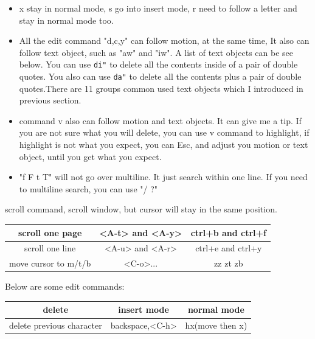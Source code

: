 \documentclass[a4paper,12pt,twoside]{book}
\begin{document}
\begin{itemize}
\begin{center}
\begin{itemize}
				\item x stay in normal mode, s go into insert mode, r need to follow a letter and stay in normal mode too.

				
				\item All the edit command "d,c,y" can follow motion, at the same time, It also can follow text object, such as "aw" and "iw". A list of text objects can be see below.  You can use \verb=di"= to delete all the contents inside of a pair of double quotes. You also can use \verb=da"= to delete all the contents plus a pair of double quotes.There are 11 groups common used text objects which I introduced in previous section. 
						
				\item command v also can follow motion and text objects. It can give me a tip. If you are not sure what you will delete, you can use v command to highlight, if highlight is not what you expect, you can Esc, and adjust you motion or text object, until you get what you expect. 

				\item "f F t T" will not go over multiline. It just search within one line. If you need to multiline search, you can use "/ ?" 
		\end{itemize}

 scroll command, scroll window, but cursor will stay in the same position.

 
 \begin{tabular}{c|c|c}
        \hline
        scroll one  page &  <A-t> and <A-y>  & ctrl+b and  ctrl+f    \\
        
        \hline 		  
        scroll one line &  <A-u> and <A-r>  & ctrl+e and ctrl+y \\
        
         \hline 		  
        move cursor to m/t/b & <C-o>...    & zz zt zb \\

    \end{tabular}
\end{center}
 
Below are some edit commands:
\begin{center}
		\begin{tabular}{c|c|c}
		\hline
		delete & insert mode & normal mode\\

   	    \hline 
		delete previous character & backspace,<C-h> & hx(move then x)  \\
		

\end{tabular}
\end{center}
\end{itemize}
\end{document}
